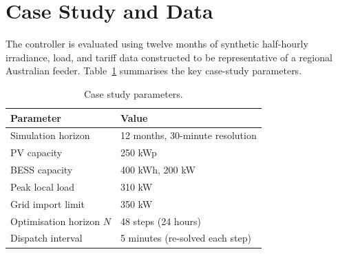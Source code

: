 \section{Case Study and Data}

The controller is evaluated using twelve months of synthetic half-hourly irradiance, load, and tariff data constructed to be representative of a regional Australian feeder. Table~\ref{tab:dataset} summarises the key case-study parameters.

\begin{table}[htbp]
\centering
\caption{Case study parameters.}
\label{tab:dataset}
\renewcommand{\arraystretch}{1.3}
\begin{tabularx}{\textwidth}{@{}l X@{}}
\toprule
\rowcolor{monashblue!10}
\textbf{Parameter} & \textbf{Value} \\
\midrule
Simulation horizon & 12 months, 30-minute resolution \\
PV capacity & 250 kWp \\
BESS capacity & 400 kWh, 200 kW \\
Peak local load & 310 kW \\
Grid import limit & 350 kW \\
Optimisation horizon $N$ & 48 steps (24 hours) \\
Dispatch interval & 5 minutes (re-solved each step) \\
\bottomrule
\end{tabularx}
\end{table}
